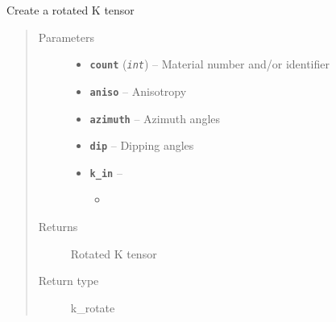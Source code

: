 \documentclass[letterpaper,10pt,english]{sphinxmanual}
\begin{document}

\begin{fulllineitems}
\label{hyvr:hyvr.hyvr.utils.rotate_ktensor}
Create a rotated K tensor
\begin{quote}\begin{description}
\item[{Parameters}] \leavevmode\begin{itemize}
\item {} 
\textbf{\texttt{count}} (\emph{\texttt{int}}) -- Material number and/or identifier

\item {} 
\textbf{\texttt{aniso}} -- Anisotropy

\item {} 
\textbf{\texttt{azimuth}} -- Azimuth angles

\item {} 
\textbf{\texttt{dip}} -- Dipping angles

\item {} 
\textbf{\texttt{k\_in}} -- \begin{itemize}
\item {} 
\end{itemize}


\end{itemize}

\item[{Returns}] \leavevmode
Rotated K tensor

\item[{Return type}] \leavevmode
k\_rotate

\end{description}\end{quote}

\end{fulllineitems}

\end{document}
